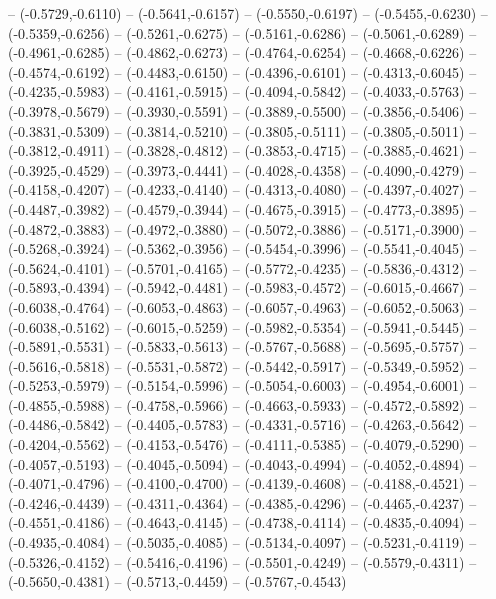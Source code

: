{	-- (-0.5729,-0.6110)
	-- (-0.5641,-0.6157)
	-- (-0.5550,-0.6197)
	-- (-0.5455,-0.6230)
	-- (-0.5359,-0.6256)
	-- (-0.5261,-0.6275)
	-- (-0.5161,-0.6286)
	-- (-0.5061,-0.6289)
	-- (-0.4961,-0.6285)
	-- (-0.4862,-0.6273)
	-- (-0.4764,-0.6254)
	-- (-0.4668,-0.6226)
	-- (-0.4574,-0.6192)
	-- (-0.4483,-0.6150)
	-- (-0.4396,-0.6101)
	-- (-0.4313,-0.6045)
	-- (-0.4235,-0.5983)
	-- (-0.4161,-0.5915)
	-- (-0.4094,-0.5842)
	-- (-0.4033,-0.5763)
	-- (-0.3978,-0.5679)
	-- (-0.3930,-0.5591)
	-- (-0.3889,-0.5500)
	-- (-0.3856,-0.5406)
	-- (-0.3831,-0.5309)
	-- (-0.3814,-0.5210)
	-- (-0.3805,-0.5111)
	-- (-0.3805,-0.5011)
	-- (-0.3812,-0.4911)
	-- (-0.3828,-0.4812)
	-- (-0.3853,-0.4715)
	-- (-0.3885,-0.4621)
	-- (-0.3925,-0.4529)
	-- (-0.3973,-0.4441)
	-- (-0.4028,-0.4358)
	-- (-0.4090,-0.4279)
	-- (-0.4158,-0.4207)
	-- (-0.4233,-0.4140)
	-- (-0.4313,-0.4080)
	-- (-0.4397,-0.4027)
	-- (-0.4487,-0.3982)
	-- (-0.4579,-0.3944)
	-- (-0.4675,-0.3915)
	-- (-0.4773,-0.3895)
	-- (-0.4872,-0.3883)
	-- (-0.4972,-0.3880)
	-- (-0.5072,-0.3886)
	-- (-0.5171,-0.3900)
	-- (-0.5268,-0.3924)
	-- (-0.5362,-0.3956)
	-- (-0.5454,-0.3996)
	-- (-0.5541,-0.4045)
	-- (-0.5624,-0.4101)
	-- (-0.5701,-0.4165)
	-- (-0.5772,-0.4235)
	-- (-0.5836,-0.4312)
	-- (-0.5893,-0.4394)
	-- (-0.5942,-0.4481)
	-- (-0.5983,-0.4572)
	-- (-0.6015,-0.4667)
	-- (-0.6038,-0.4764)
	-- (-0.6053,-0.4863)
	-- (-0.6057,-0.4963)
	-- (-0.6052,-0.5063)
	-- (-0.6038,-0.5162)
	-- (-0.6015,-0.5259)
	-- (-0.5982,-0.5354)
	-- (-0.5941,-0.5445)
	-- (-0.5891,-0.5531)
	-- (-0.5833,-0.5613)
	-- (-0.5767,-0.5688)
	-- (-0.5695,-0.5757)
	-- (-0.5616,-0.5818)
	-- (-0.5531,-0.5872)
	-- (-0.5442,-0.5917)
	-- (-0.5349,-0.5952)
	-- (-0.5253,-0.5979)
	-- (-0.5154,-0.5996)
	-- (-0.5054,-0.6003)
	-- (-0.4954,-0.6001)
	-- (-0.4855,-0.5988)
	-- (-0.4758,-0.5966)
	-- (-0.4663,-0.5933)
	-- (-0.4572,-0.5892)
	-- (-0.4486,-0.5842)
	-- (-0.4405,-0.5783)
	-- (-0.4331,-0.5716)
	-- (-0.4263,-0.5642)
	-- (-0.4204,-0.5562)
	-- (-0.4153,-0.5476)
	-- (-0.4111,-0.5385)
	-- (-0.4079,-0.5290)
	-- (-0.4057,-0.5193)
	-- (-0.4045,-0.5094)
	-- (-0.4043,-0.4994)
	-- (-0.4052,-0.4894)
	-- (-0.4071,-0.4796)
	-- (-0.4100,-0.4700)
	-- (-0.4139,-0.4608)
	-- (-0.4188,-0.4521)
	-- (-0.4246,-0.4439)
	-- (-0.4311,-0.4364)
	-- (-0.4385,-0.4296)
	-- (-0.4465,-0.4237)
	-- (-0.4551,-0.4186)
	-- (-0.4643,-0.4145)
	-- (-0.4738,-0.4114)
	-- (-0.4835,-0.4094)
	-- (-0.4935,-0.4084)
	-- (-0.5035,-0.4085)
	-- (-0.5134,-0.4097)
	-- (-0.5231,-0.4119)
	-- (-0.5326,-0.4152)
	-- (-0.5416,-0.4196)
	-- (-0.5501,-0.4249)
	-- (-0.5579,-0.4311)
	-- (-0.5650,-0.4381)
	-- (-0.5713,-0.4459)
	-- (-0.5767,-0.4543)
}
